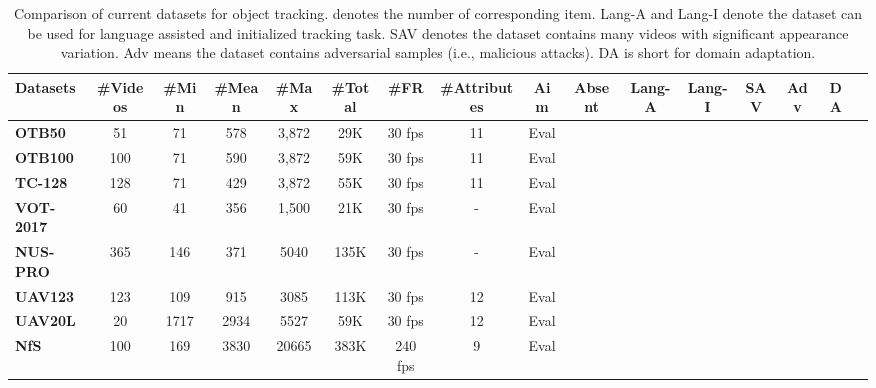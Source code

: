 \documentclass[final]{cvpr}
\begin{document}
\begin{table*}[htp]
\center
\scriptsize 
\caption{Comparison of current datasets for object tracking.  denotes the number of corresponding item. Lang-A and Lang-I denote the dataset can be used for language assisted and initialized tracking task. SAV denotes the dataset contains many videos with significant appearance variation. Adv means the dataset contains adversarial samples (i.e., malicious attacks). DA is short for domain adaptation.} \label{benchmarkList}
\begin{tabular}{l|ccccccccccccccc}
\hline \toprule [0.8 pt]
\textbf{Datasets}    &\textbf{\#Videos}  &\textbf{\#Min} &\textbf{\#Mean} &\textbf{\#Max} &\textbf{\#Total} &\textbf{\#FR}  &\textbf{\#Attributes} &\textbf{Aim} &\textbf{Absent} &\textbf{Lang-A} &\textbf{Lang-I} & \textbf{SAV}      &\textbf{Adv}   &\textbf{DA} \\ 
\hline
\textbf{OTB50 \cite{Wu2013Online}}   	    &51       &71 	&578    &3,872    &29K    &30 fps      &11    &Eval      &       &     &           &             &          &           \\
\textbf{OTB100 \cite{wu2015object}}   	&100     &71  	&590    &3,872    &59K    &30 fps     &11    &Eval    &      &         &           &          &         &            \\
\textbf{TC-128 \cite{Liang2015Encoding}}   	    &128     &71  	&429    &3,872    &55K    &30 fps       &11    &Eval     &    &      &            &         &            &             \\
\textbf{VOT-2017 \cite{VOT_TPAMI}}   &60      &41  	&356    &1,500    &21K    &30 fps     &-    &Eval    &       &     &     &                 &             &          \\
\textbf{NUS-PRO \cite{nus_pro}}   	&365     &146  	&371    &5040    &135K    &30 fps      &-    &Eval    &       &      &          &            &          &            \\
\textbf{UAV123 \cite{mueller2016benchmarkuav20l}}   	&123     &109  	&915    &3085    &113K    &30 fps         &12    &Eval    &       &      &     &            &               &            \\
\textbf{UAV20L \cite{mueller2016benchmarkuav20l}}   	&20     &1717  	&2934    &5527    &59K    &30 fps          &12    		&Eval    &       &       &  &           &              &                \\
\textbf{NfS \cite{kiani2017Nfs}}   	            &100     &169  	&3830    &20665    &383K    &240 fps           &9    &Eval    &       &         &      &            &          &             \\

\end{tabular}
\end{table*}
\end{document}
